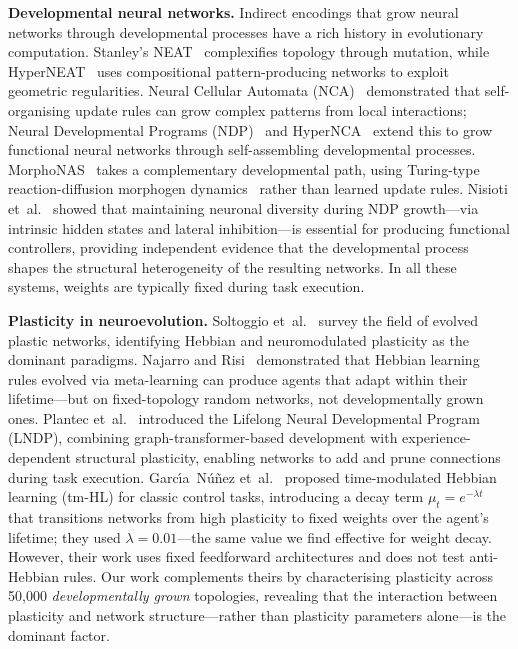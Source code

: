 \documentclass[sigconf,nonacm]{acmart}
\begin{document}
\textbf{Developmental neural networks.}
Indirect encodings that grow neural networks through developmental processes have a rich history in evolutionary computation. Stanley's NEAT~\cite{stanley2002evolving} complexifies topology through mutation, while HyperNEAT~\cite{stanley2009hypercube} uses compositional pattern-producing networks to exploit geometric regularities. Neural Cellular Automata (NCA)~\cite{mordvintsev2020growing} demonstrated that self-organising update rules can grow complex patterns from local interactions; Neural Developmental Programs (NDP)~\cite{najarro2023ndp} and HyperNCA~\cite{najarro2022hypernca} extend this to grow functional neural networks through self-assembling developmental processes. MorphoNAS~\cite{glybovets2026morphonas} takes a complementary developmental path, using Turing-type reaction-diffusion morphogen dynamics~\cite{turing1952chemical} rather than learned update rules. Nisioti et~al.~\cite{nisioti2024growing} showed that maintaining neuronal diversity during NDP growth---via intrinsic hidden states and lateral inhibition---is essential for producing functional controllers, providing independent evidence that the developmental process shapes the structural heterogeneity of the resulting networks. In all these systems, weights are typically fixed during task execution.

\textbf{Plasticity in neuroevolution.}
Soltoggio et~al.~\cite{soltoggio2018born} survey the field of evolved plastic networks, identifying Hebbian and neuromodulated plasticity as the dominant paradigms. Najarro and Risi~\cite{najarro2020meta} demonstrated that Hebbian learning rules evolved via meta-learning can produce agents that adapt within their lifetime---but on fixed-topology random networks, not developmentally grown ones. Plantec et~al.~\cite{plantec2024evolving} introduced the Lifelong Neural Developmental Program (LNDP), combining graph-transformer-based development with experience-dependent structural plasticity, enabling networks to add and prune connections during task execution. Garc{\'\i}a~N{\'u}{\~n}ez et~al.~\cite{garcianunez2025time} proposed time-modulated Hebbian learning (tm-HL) for classic control tasks, introducing a decay term $\mu_t = e^{-\lambda t}$ that transitions networks from high plasticity to fixed weights over the agent's lifetime; they used $\lambda = 0.01$---the same value we find effective for weight decay. However, their work uses fixed feedforward architectures and does not test anti-Hebbian rules. Our work complements theirs by characterising plasticity across 50{,}000 \emph{developmentally grown} topologies, revealing that the interaction between plasticity and network structure---rather than plasticity parameters alone---is the dominant factor.
\end{document}
